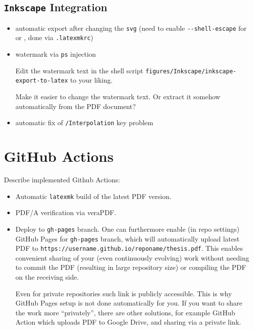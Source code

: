 \subsection{\texorpdfstring{\texttt{Inkscape}}{Inkscape} Integration}%
\label{sub:Inkscape Integration}

\begin{itemize}
    \item automatic export after changing the \texttt{svg} (need to enable \verb|--shell-escape| for \pdfTeX{} or \LuaTeX{}, done via \texttt{.latexmkrc})
    \item watermark via \texttt{ps} injection
          \begin{remark}
              Edit the watermark text in the shell script \verb|figures/Inkscape/inkscape-export-to-latex| to your liking.
          \end{remark}
          \begin{Todo}
              Make it easier to change the watermark text.
              Or extract it somehow automatically from the PDF document?
          \end{Todo}
    \item automatic fix of \texttt{/Interpolation} key problem
\end{itemize}


\section{GitHub Actions}%
\label{sec:GitHub Actions}

Describe implemented Github Actions:
\begin{itemize}
    \item Automatic \texttt{latexmk} build of the latest PDF version.
    \item PDF/A verification via veraPDF.
    \item Deploy to \texttt{gh-pages} branch.
          One can furthermore enable (in repo settings) GitHub Pages for \texttt{gh-pages} branch, which will automatically upload latest PDF to \texttt{https://username.github.io/reponame/thesis.pdf}.
          This enables convenient sharing of your (even continuously evolving) work without needing to commit the PDF (resulting in large repository size) or compiling the PDF on the receiving side.
          \begin{remark}
              Even for private repositories such link is publicly accessible.
              This is why GitHub Pages setup is not done automatically for you.
              If you want to share the work more \enquote{privately}, there are other solutions, for example GitHub Action which uploads PDF to Google Drive, and sharing via a private link.
          \end{remark}
\end{itemize}


